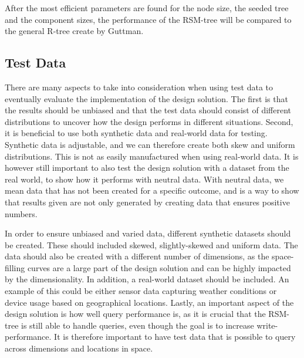\noindent
After the most efficient parameters are found for the node size, the seeded tree and the component sizes, the performance of the RSM-tree will be compared to the general R-tree create by Guttman\cite{r-tree}. 

\subsection{Test Data}
There are many aspects to take into consideration when using test data to eventually evaluate the implementation of the design solution. The first is that the results should be unbiased and that the test data should consist of different distributions to uncover how the design performs in different situations. Second, it is beneficial to use both synthetic data and real-world data for testing. Synthetic data is adjustable, and we can therefore create both skew and uniform distributions. This is not as easily manufactured when using real-world data. It is however still important to also test the design solution with a dataset from the real world, to show how it performs with neutral data. With neutral data, we mean data that has not been created for a specific outcome, and is a way to show that results given are not only generated by creating data that ensures positive numbers.\newline

\noindent
In order to ensure unbiased and varied data, different synthetic datasets should be created. These should included skewed, slightly-skewed and uniform data. The data should also be created with a different number of dimensions, as the space-filling curves are a large part of the design solution and can be highly impacted by the dimensionality. In addition, a real-world dataset should be included. An example of this could be either sensor data capturing weather conditions or device usage based on geographical locations. Lastly, an important aspect of the design solution is how well query performance is, as it is crucial that the RSM-tree is still able to handle queries, even though the goal is to increase write-performance. It is therefore important to have test data that is possible to query across dimensions and locations in space. 